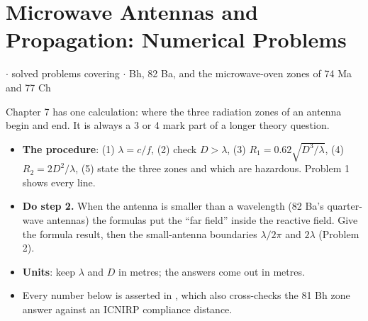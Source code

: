 \section{Microwave Antennas and Propagation: Numerical Problems}
{\color{sub}\footnotesize {} \gap$\cdot$ solved problems covering 
\gap$\cdot$ Bh, 82 Ba, and the microwave-oven zones of 74 Ma and 77 Ch}

\vspace{3pt}\noindent
\colorbox{gdL}{\makebox[\dimexpr\textwidth-2\fboxsep][l]{%
  \textcolor{gd}{\bfseries\footnotesize READ THIS FIRST}}}
\par\nobreak\vspace{3pt}

Chapter 7 has one calculation: where the three radiation zones of an antenna begin and end. It
is always a 3 or 4 mark part of a longer theory question.
\begin{itemize}
  \item \textbf{The procedure}: (1) $\lambda = c/f$, (2) check $D > \lambda$, (3)
    $R_1 = 0.62\sqrt{D^3/\lambda}$, (4) $R_2 = 2D^2/\lambda$, (5) state the three zones and
    which are hazardous. Problem 1 shows every line.
  \item \textbf{Do step 2.} When the antenna is smaller than a wavelength (82 Ba's
    quarter-wave antennas) the formulas put the ``far field'' inside the reactive field. Give
    the formula result, then the small-antenna boundaries $\lambda/2\pi$ and $2\lambda$
    (Problem 2).
  \item \textbf{Units}: keep $\lambda$ and $D$ in metres; the answers come out in metres.
  \item Every number below is asserted in , which also cross-checks the
    81 Bh zone answer against an ICNIRP compliance distance.
\end{itemize}

\vspace{2pt}


